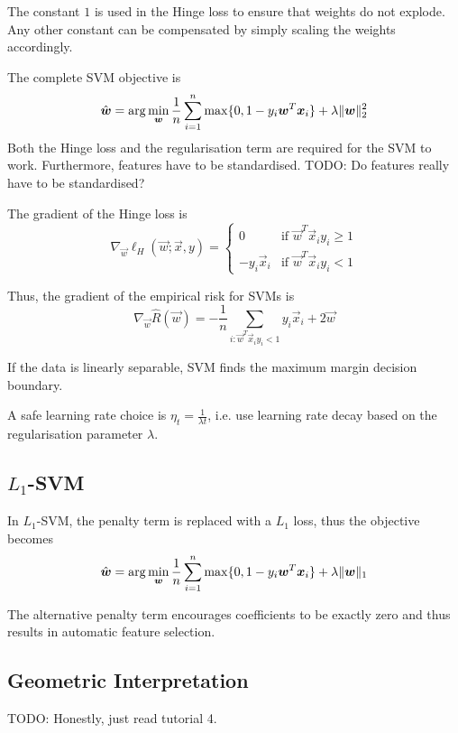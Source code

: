 The constant $1$ is used in the Hinge loss to ensure
that weights do not explode.
Any other constant can be compensated by simply
scaling the weights accordingly.

The complete SVM objective is
\begin{equation*}
\hat{\boldsymbol{w}} = \arg\min_{\boldsymbol{w}} \frac{1}{n}
\sum_{i=1}^n \max\{0, 1 - y_i \boldsymbol{w}^T \boldsymbol{x}_i\}
+ \lambda \lVert\boldsymbol{w}\rVert_2^2
\end{equation*}
Both the Hinge loss and the regularisation term are required for
the SVM to work.
Furthermore, features have to be standardised.
TODO: Do features really have to be standardised?

The gradient of the Hinge loss is
\begin{equation*}
\nabla_{\vec{w}} \ell_H(\vec{w}; \vec{x}, y) =
\begin{cases}
0 & \text{if $\vec{w}^T \vec{x}_i y_i \geq 1$} \\
-y_i \vec{x}_i & \text{if $\vec{w}^T \vec{x}_i y_i < 1$}
\end{cases}
\end{equation*}

Thus, the gradient of the empirical risk for SVMs is
\begin{equation*}
\nabla_{\vec{w}} \hat{R}(\vec{w})
= - \frac{1}{n} \sum_{i : \vec{w}^T \vec{x}_i y_i < 1}{
	y_i \vec{x}_i
}
+ 2 \vec{w}
\end{equation*}

If the data is linearly separable, SVM finds the
maximum margin decision boundary.

A safe learning rate choice is $\eta_t = \frac{1}{\lambda t}$, i.e. use learning rate decay
based on the regularisation parameter $\lambda$.


\subsection{$L_1$-SVM}
In $L_1$-SVM, the penalty term is replaced with a $L_1$ loss,
thus the objective becomes
\begin{equation*}
\hat{\boldsymbol{w}} = \arg\min_{\boldsymbol{w}} \frac{1}{n}
\sum_{i=1}^n \max\{0, 1 - y_i \boldsymbol{w}^T \boldsymbol{x}_i\}
+ \lambda \lVert\boldsymbol{w}\rVert_1
\end{equation*}

The alternative penalty term encourages coefficients to be
exactly zero and thus results in automatic feature selection.


\subsection{Geometric Interpretation}
TODO: Honestly, just read tutorial 4.

